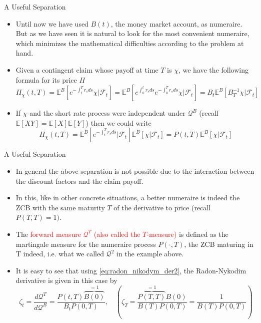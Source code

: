 \documentclass{beamer}
\begin{document}
\begin{frame}{A Useful Separation}
  \begin{itemize}
  \item<1-> Until now we have used $B(t)$, the money market account, as numeraire. But as we have seen it is natural to look for the most convenient numeraire, which minimizes the mathematical difficulties according to the problem at hand.
  \item<2-> Given a contingent claim whose payoff at time $T$ is $\chi$, we have the following formula for its price $\Pi$
    \begin{equation*}
      \Pi_\chi(t,T)=\mathbb{E}^B\left[e^{-\int_t^T r_s ds}\chi\bigg|\mathcal{F}_t \right]=\mathbb{E}^B\left[e^{\int_0^t r_s ds}e^{-\int_0^T r_s ds}\chi\bigg|\mathcal{F}_t \right]=B_t\mathbb{E}^B\left[B^{-1}_T\chi|\mathcal{F}_t\right]
    \end{equation*}
  \item<3-> If $\chi$ and the short rate process were independent under $\mathcal{Q}^B$ (recall $\mathbb{E}[XY]=\mathbb{E}[X]\mathbb{E}[Y]$) then we could write
    \begin{equation*}
      \Pi_\chi(t,T)=\mathbb{E}^B\left[e^{-\int_t^T r_s ds}\bigg|\mathcal{F}_t\right]\mathbb{E}^B\left[\chi|\mathcal{F}_t\right] = P(t,T)\mathbb{E}^B\left[\chi|\mathcal{F}_t\right]
    \end{equation*}
  \end{itemize}
\end{frame}

\begin{frame}{A Useful Separation}
  \begin{itemize}
  \item<1-> In general the above separation is not possible due to the interaction between the discount factors and the claim payoff. 
  \item<2-> In this, like in other concrete situations, a better numeraire is indeed the ZCB with the same maturity $T$ of the derivative to price (recall $P(T,T)=1)$.
  \item<3-> The \textcolor{red}{forward measure $\mathcal{Q}^T$ (also called the $T$-measure)} is defined as the martingale measure for the numeraire process $P(\cdot,T)$, the ZCB maturing in T indeed, i.e. what we called $\mathcal{Q}^2$ in the example above.
  \item<4-> It is easy to see that using \cref{eq:radon_nikodym_der2}, the Radon-Nykodim derivative is given in this case by
    \begin{equation}
      \zeta_t = \frac{d\mathcal{Q}^T}{d\mathcal{Q}^B} = \frac{P(t,T)\overbrace{B(0)}^{=1}}{B_t P(0,T)} ,\quad\left(\zeta_T=\frac{\overbrace{P(T,T)}^{=1}B(0)}{B(T)P(0,T)}=\frac{1}{B(T)P(0,T)}\right)
      \label{eq:radon_nikodym_t_forward}
    \end{equation}
  \end{itemize}
\end{frame}
\end{document}
